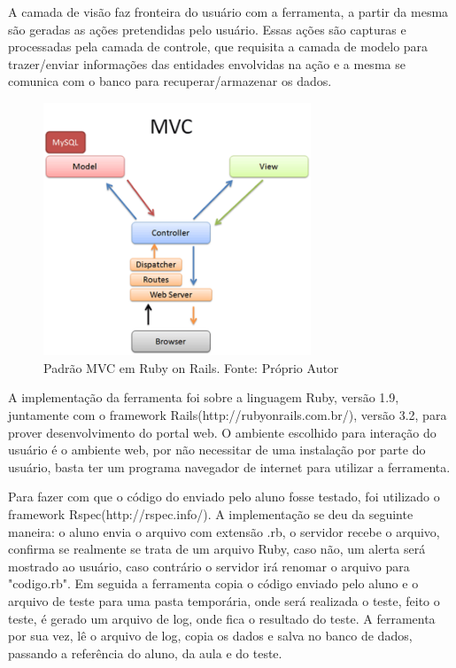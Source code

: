 \documentclass[pnumabnt,normaltoc,espacoumemeio,capchap]{abnt}
\begin{document}
\par A camada de visão faz fronteira do usuário com a ferramenta, a partir da mesma são geradas as ações pretendidas pelo usuário. Essas ações são capturas e processadas pela camada de controle, que requisita a camada de modelo para trazer/enviar informações das entidades envolvidas na ação e a mesma se comunica com o banco para recuperar/armazenar os dados.
\begin{figure}[htbp]
	\centering
	\caption{Padrão MVC em Ruby on Rails\label{fig:mvc}. Fonte: Próprio Autor}
	\includegraphics[width=8cm,scale=1]{images/mvc.png}
\end{figure}
\par A implementação da ferramenta foi sobre a linguagem Ruby, versão 1.9, juntamente com o framework Rails(http://rubyonrails.com.br/), versão 3.2, para prover desenvolvimento do portal web. O ambiente escolhido para interação do usuário é o ambiente web, por não necessitar de uma instalação por parte do usuário, basta ter um programa navegador de internet para utilizar a ferramenta.
\par Para fazer com que o código do enviado pelo aluno fosse testado, foi utilizado o framework Rspec(http://rspec.info/). A implementação se deu da seguinte maneira: o aluno envia o arquivo com extensão .rb, o servidor recebe o arquivo, confirma se realmente se trata de um arquivo Ruby, caso não, um alerta será mostrado ao usuário, caso contrário o servidor irá renomar o arquivo para "codigo.rb". Em seguida a ferramenta copia o código enviado pelo aluno e o arquivo de teste para uma pasta temporária, onde será realizada o teste, feito o teste, é gerado um arquivo de log, onde fica o resultado do teste. A ferramenta por sua vez, lê o arquivo de log, copia os dados e salva no banco de dados, passando a referência do aluno, da aula e do teste.
\end{document}
